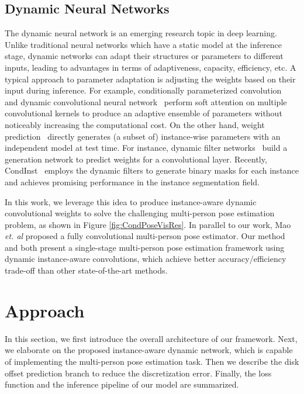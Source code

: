 \documentclass[sigconf]{acmart}
\begin{document}
\subsection{Dynamic Neural Networks}
The dynamic neural network is an emerging research topic in deep learning.
Unlike traditional neural networks which have a static model at the inference stage, dynamic networks can adapt their structures or parameters to different inputs, leading to advantages in terms of adaptiveness, capacity, efficiency, etc.
A typical approach to parameter adaptation is adjusting the weights based on their input during inference.
For example, conditionally parameterized convolution~\cite{yang2019condconv} and dynamic convolutional neural network~\cite{Chen_2020_CVPR} perform soft attention on multiple convolutional kernels to produce an adaptive ensemble of parameters without noticeably increasing the computational cost.
On the other hand, weight prediction~\cite{DBLP:conf/nips/DenilSDRF13} directly generates (a subset of) instance-wise parameters with an independent model at test time. 
For instance, dynamic filter networks~\cite{jia2016dynamic} build a generation network to predict weights for a convolutional layer.
Recently, CondInst~\cite{tian2020conditional} employs the dynamic filters to generate binary masks for each instance and achieves promising performance in the instance segmentation field.

In this work, we leverage this idea to produce instance-aware dynamic convolutional weights to solve the challenging multi-person pose estimation problem, as shown in Figure \ref{fig:CondPoseVisRes}.
In parallel to our work, Mao \textit{et. al} \cite{Mao_2021_CVPR} proposed a fully convolutional multi-person pose estimator.
Our method and \cite{Mao_2021_CVPR} both present a single-stage multi-person pose estimation framework using dynamic instance-aware convolutions, which achieve better accuracy/efficiency trade-off than other state-of-the-art methods.

\section{Approach}
In this section, we first introduce the overall architecture of our framework. Next, we elaborate on the proposed instance-aware dynamic network, which is capable of implementing the multi-person pose estimation task. Then we describe the disk offset prediction branch to reduce the discretization error. Finally, the loss function and the inference pipeline of our model are summarized.
\end{document}
